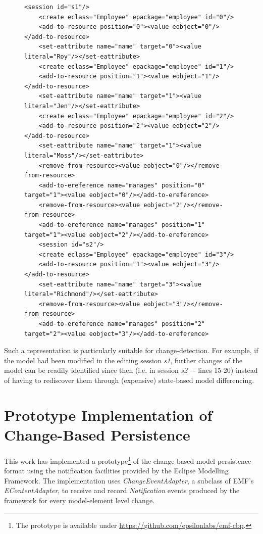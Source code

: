 \documentclass[12pt, a4paper]{report} \usepackage[titletoc]{appendix}
\begin{document}
\begin{figure}[h]
	\begin{lstlisting}[style=xml,caption={Change-based representation of the model of Figure \ref{fig:modified_chart}.},label=lst:cbpmodel_0]
	<session id="s1"/>
	<create eclass="Employee" epackage="employee" id="0"/>
	<add-to-resource position="0"><value eobject="0"/></add-to-resource>
	<set-eattribute name="name" target="0"><value literal="Roy"/></set-eattribute>
	<create eclass="Employee" epackage="employee" id="1"/>
	<add-to-resource position="1"><value eobject="1"/></add-to-resource>
	<set-eattribute name="name" target="1"><value literal="Jen"/></set-eattribute>
	<create eclass="Employee" epackage="employee" id="2"/>
	<add-to-resource position="2"><value eobject="2"/></add-to-resource>
	<set-eattribute name="name" target="1"><value literal="Moss"/></set-eattribute>
	<remove-from-resource><value eobject="0"/></remove-from-resource>
	<add-to-ereference name="manages" position="0" target="1"><value eobject="0"/></add-to-ereference>
	<remove-from-resource><value eobject="2"/></remove-from-resource>
	<add-to-ereference name="manages" position="1" target="1"><value eobject="2"/></add-to-ereference>
	<session id="s2"/>
	<create eclass="Employee" epackage="employee" id="3"/>
	<add-to-resource position="1"><value eobject="3"/></add-to-resource>
	<set-eattribute name="name" target="3"><value literal="Richmond"/></set-eattribute>
	<remove-from-resource><value eobject="3"/></remove-from-resource>
	<add-to-ereference name="manages" position="2" target="2"><value eobject="3"/></add-to-ereference>
	\end{lstlisting}
\end{figure}

Such a representation is particularly suitable for change-detection. For example, if the model had been modified in the editing session \emph{s1}, further changes of the model can be readily identified since then (i.e. in session \emph{s2} –- lines 15-20) instead of having to rediscover them through (expensive) state-based model differencing.

\section{Prototype Implementation of Change-Based Persistence}
\label{sec:prototype_implementation_of_change-based_persistence}
This work has implemented a prototype\footnote{The prototype is available under \url{https://github.com/epsilonlabs/emf-cbp}.} of the change-based model persistence format using the notification facilities provided by the Eclipse Modelling Framework. The implementation uses \emph{ChangeEventAdapter}, a subclass of EMF's \emph{EContentAdapter}, to receive and record \emph{Notification} events produced by the framework for every model-element level change.
\end{document}
